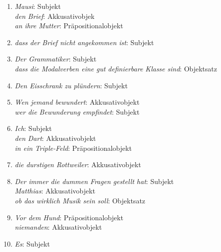 \begin{enumerate}\Lf
  \item \textit{Mausi}: Subjekt\\
    \textit{den Brief}: Akkusativobjek\\
    \textit{an ihre Mutter}: Präpositionalobjekt
  \item \textit{dass der Brief nicht angekommen ist}: Subjekt
  \item \textit{Der Grammatiker}: Subjekt\\
    \textit{dass die Modalverben eine gut definierbare Klasse sind}: Objektsatz
  \item \textit{Den Eisschrank zu plündern}: Subjekt
  \item \textit{Wen jemand bewundert}: Akkusativobjekt\\
    \textit{wer die Bewunderung empfindet}: Subjekt
  \item \textit{Ich}: Subjekt\\
    \textit{den Dart}: Akkusativobjekt\\
    \textit{in ein Triple-Feld}: Präpositionalobjekt
  \item \textit{die durstigen Rottweiler}: Akkusativobjekt
  \item \textit{Der immer die dummen Fragen gestellt hat}: Subjekt\\
    \textit{Matthias}: Akkusativobjekt\\
    \textit{ob das wirklich Musik sein soll}: Objektsatz 
  \item \textit{Vor dem Hund}: Präpositionalobjekt\\
    \textit{niemanden}: Akkusativobjekt
  \item \textit{Es}: Subjekt
\end{enumerate}


